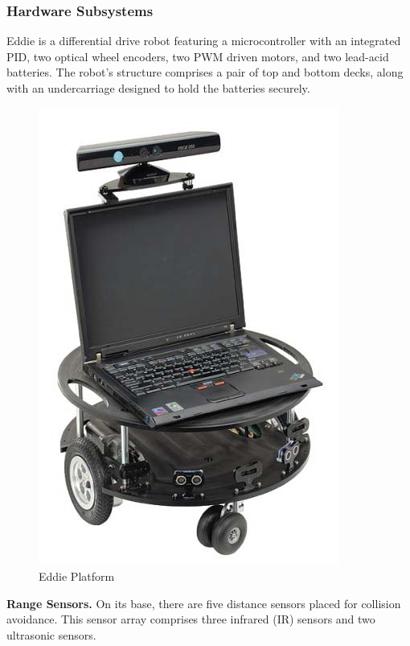\subsubsection{Hardware Subsystems}
Eddie is a differential drive robot featuring a microcontroller with an integrated PID, two optical wheel encoders, two PWM driven motors, and two lead-acid batteries. 
The robot's structure comprises a pair of top and bottom decks, along with an undercarriage designed to hold the batteries securely.\\
\begin{figure}[H]
	\centering
	\includegraphics[width=0.8\linewidth]{figures/platform.png}
	\caption{Eddie Platform}
	\label{fig:platform}
\end{figure}

\textbf{Range Sensors.} On its base, there are five distance sensors placed for collision avoidance. This sensor array comprises three infrared (IR) sensors and two ultrasonic sensors.\\

